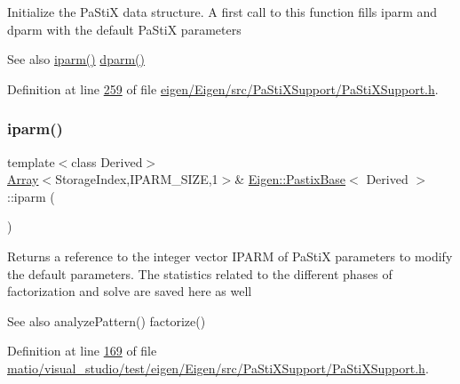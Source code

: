 Initialize the Pa\+StiX data structure. A first call to this function fills iparm and dparm with the default Pa\+StiX parameters \begin{DoxySeeAlso}{See also}
\hyperlink{class_eigen_1_1_pastix_base_a38378e7b2b5c750a8a23e2c21a69146c}{iparm()} \hyperlink{class_eigen_1_1_pastix_base_af4a29373aa3e6a980738efde33f92a76}{dparm()} 
\end{DoxySeeAlso}


Definition at line \hyperlink{eigen_2_eigen_2src_2_pa_sti_x_support_2_pa_sti_x_support_8h_source_l00259}{259} of file \hyperlink{eigen_2_eigen_2src_2_pa_sti_x_support_2_pa_sti_x_support_8h_source}{eigen/\+Eigen/src/\+Pa\+Sti\+X\+Support/\+Pa\+Sti\+X\+Support.\+h}.

\mbox{\label{class_eigen_1_1_pastix_base_a38378e7b2b5c750a8a23e2c21a69146c}} 
\subsubsection{\texorpdfstring{iparm()}{iparm()}\hspace{0.1cm}{\footnotesize\ttfamily [1/4]}}
{\footnotesize\ttfamily template$<$class Derived$>$ \\
\hyperlink{group___core___module_class_eigen_1_1_array}{Array}$<$Storage\+Index,I\+P\+A\+R\+M\+\_\+\+S\+I\+ZE,1$>$\& \hyperlink{class_eigen_1_1_pastix_base}{Eigen\+::\+Pastix\+Base}$<$ Derived $>$\+::iparm (\begin{DoxyParamCaption}{ }\end{DoxyParamCaption})\hspace{0.3cm}{\ttfamily [inline]}}

Returns a reference to the integer vector I\+P\+A\+RM of Pa\+StiX parameters to modify the default parameters. The statistics related to the different phases of factorization and solve are saved here as well \begin{DoxySeeAlso}{See also}
analyze\+Pattern() factorize() 
\end{DoxySeeAlso}


Definition at line \hyperlink{matio_2visual__studio_2test_2eigen_2_eigen_2src_2_pa_sti_x_support_2_pa_sti_x_support_8h_source_l00169}{169} of file \hyperlink{matio_2visual__studio_2test_2eigen_2_eigen_2src_2_pa_sti_x_support_2_pa_sti_x_support_8h_source}{matio/visual\+\_\+studio/test/eigen/\+Eigen/src/\+Pa\+Sti\+X\+Support/\+Pa\+Sti\+X\+Support.\+h}.

